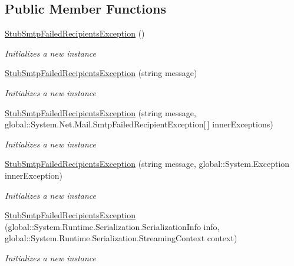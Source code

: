 \subsection*{Public Member Functions}
\begin{DoxyCompactItemize}
\item 
\hyperlink{class_system_1_1_net_1_1_mail_1_1_fakes_1_1_stub_smtp_failed_recipients_exception_a9af53eb7e98b7d15f9c6d1a12b14d271}{Stub\-Smtp\-Failed\-Recipients\-Exception} ()
\begin{DoxyCompactList}\small\item\em Initializes a new instance\end{DoxyCompactList}\item 
\hyperlink{class_system_1_1_net_1_1_mail_1_1_fakes_1_1_stub_smtp_failed_recipients_exception_a5829fb1568b89b0f53d21d18a3d67c85}{Stub\-Smtp\-Failed\-Recipients\-Exception} (string message)
\begin{DoxyCompactList}\small\item\em Initializes a new instance\end{DoxyCompactList}\item 
\hyperlink{class_system_1_1_net_1_1_mail_1_1_fakes_1_1_stub_smtp_failed_recipients_exception_a6966a35a0ce313319ff87d35019e4efc}{Stub\-Smtp\-Failed\-Recipients\-Exception} (string message, global\-::\-System.\-Net.\-Mail.\-Smtp\-Failed\-Recipient\-Exception\mbox{[}$\,$\mbox{]} inner\-Exceptions)
\begin{DoxyCompactList}\small\item\em Initializes a new instance\end{DoxyCompactList}\item 
\hyperlink{class_system_1_1_net_1_1_mail_1_1_fakes_1_1_stub_smtp_failed_recipients_exception_ae7e27956e91bf0f915ede7a14838830e}{Stub\-Smtp\-Failed\-Recipients\-Exception} (string message, global\-::\-System.\-Exception inner\-Exception)
\begin{DoxyCompactList}\small\item\em Initializes a new instance\end{DoxyCompactList}\item 
\hyperlink{class_system_1_1_net_1_1_mail_1_1_fakes_1_1_stub_smtp_failed_recipients_exception_a8db4ff09ba871c47a4aab1d3930c53ca}{Stub\-Smtp\-Failed\-Recipients\-Exception} (global\-::\-System.\-Runtime.\-Serialization.\-Serialization\-Info info, global\-::\-System.\-Runtime.\-Serialization.\-Streaming\-Context context)
\begin{DoxyCompactList}\small\item\em Initializes a new instance\end{DoxyCompactList}\item 

\end{DoxyCompactItemize}

